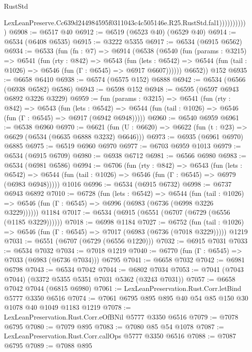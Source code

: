 \begin{lexlean}{RustStd}
\begin{coremodule}
                          LexLeanPreserve.Cc639d244984595f0311043c4c505146e.R25.RustStd.fal1)))))))))))
@6908 := @6517 @40
@6912 := @6519 (@6523 @40) (@6529 @40)
@6914 := @6534 (@6408 @6535)
@6915 := @3222 @5355
@6917 := @6534 (@6915 @6562)
@6934 := @6533
    (fun (fn : @7) =>
    @6914
      (@6538
        (@6540
          (fun (params : @3215) =>
          @6541
            (fun (rty : @842) =>
            @6543
              (fun (lets : @6542) =>
              @6544 (fun (tail : @1026) => @6546 (fun (Γ : @6545) => @6917 @6607))))))
        @6652))
    @152
@6935 := @6658 @6410
@6938 := @6574 (@6575 @152) @6888
@6942 := @6534 (@6566 (@6938 @6582) @6586)
@6943 := @6598 @152
@6948 := @6595 (@6597 @6943 @6892 @3226 @3229)
@6959 := fun (params : @3215) =>
  @6541
    (fun (rty : @842) =>
    @6543
      (fun (lets : @6542) =>
      @6544 (fun (tail : @1026) => @6546 (fun (Γ : @6545) => @6917 (@6942 @6948)))))
@6960 := @6540 @6959
@6961 := @6538 @6960
@6970 := @6621 (fun (U : @6620) => @6622 (fun (t : @23) => @6629 (@6534 (@6635 @6888 @3232) @6646)))
@6973 := @6935 (@6961 @6970) @6885
@6975 := @6519 @6960 @6970
@6977 := @6703 @6959 @1013
@6979 := @6534 (@6915 @6709)
@6980 := @6938 @6712
@6981 := @6566 @6980
@6983 := @6534 (@6981 @6586)
@6994 := @6706
    (fun (rty : @842) =>
    @6543
      (fun (lets : @6542) =>
      @6544 (fun (tail : @1026) => @6546 (fun (Γ : @6545) => @6979 (@6983 @6948)))))
    @1016
@6996 := @6534 (@6915 @6732)
@6998 := @6737 @6943 @6892
@7010 := @6728
    (fun (lets : @6542) =>
    @6544
      (fun (tail : @1026) => @6546 (fun (Γ : @6545) => @6996 (@6983 (@6736 (@6998 @3226 @3229))))))
    @1184
@7017 := @6534 (@6915 (@6551 (@6707 (@6729 (@6556 (@1185 @3229))))))
@7018 := @6998 @1184
@7027 := @6752
    (fun (tail : @1026) => @6546 (fun (Γ : @6545) => @7017 (@6983 (@6736 (@7018 @3229)))))
    @1219
@7031 := @6551 (@6707 (@6729 (@6556 @1220)))
@7032 := @6915 @7031
@7033 := @6534 @7032
@7034 := @7018 @1219
@7040 := @6770 (fun (Γ : @6545) => @7033 (@6983 (@6736 @7034))) @6795
@7041 := @6658 @7032
@7042 := @6981 @6798
@7043 := @6534 @7042
@7044 := @6802 @7034
@7053 := @7041 (@7043 @7044) (@3372 @5355 @5351 @7031 @5362 (@3243 @7031))
@7057 := @6658 @7042 @7044 (@6815 @6980)
@7061 := LexLeanPreservation.Rust.Corr.letBind @5777 @3350 @6516
@7074 := @7061 @6795 @895 @895 @40 @54 @85 @150 @30 @1078 @40 @1049 @1183 @1219
@7078 := LexLeanPreservation.Rust.Corr.eOfBNil @5777 @3350 @6516
@7079 := @7078 @6795
@7080 := @7079 @895
@7083 := @7080 @85 @54 @1078
@7087 := LexLeanPreservation.Rust.Corr.callOps @5777 @3350 @6516
@7088 := @7087 @6795
@7089 := @7088 @895

\end{coremodule}
\end{lexlean}
